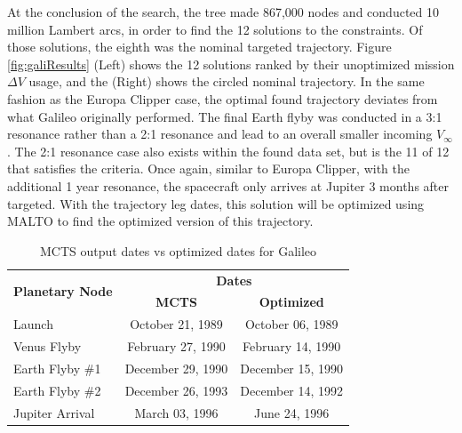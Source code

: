 \documentclass[letterpaper, preprint, paper,11pt]{AAS}	%
\begin{document}
At the conclusion of the search, the tree made 867,000 nodes and conducted 10 million Lambert arcs, in order to find the 12 solutions to the constraints. Of those solutions, the eighth was the nominal targeted trajectory. Figure \ref*{fig:galiResults} (Left) shows the 12 solutions ranked by their unoptimized mission $\Delta V$ usage, and the (Right) shows the circled nominal trajectory. In the same fashion as the Europa Clipper case, the optimal found trajectory deviates from what Galileo originally performed. The final Earth flyby was conducted in a 3:1 resonance rather than a 2:1 resonance and lead to an overall smaller incoming $V_\infty$. The 2:1 resonance case also exists within the found data set, but is the 11 of 12 that satisfies the criteria. Once again, similar to Europa Clipper, with the additional 1 year resonance, the spacecraft only arrives at Jupiter 3 months after targeted. With the trajectory leg dates, this solution will be optimized using MALTO to find the optimized version of this trajectory.
\begin{table}[htb]
    \begin{center}
        \caption{MCTS output dates vs optimized dates for Galileo}
        \label{table:galiMInputs}
        \begin{tabular}{lcc}
            \toprule
            \multirow{2}{*}{\textbf{Planetary Node}} & \multicolumn{2}{c}{\textbf{Dates}}\\
            \cmidrule{2-3}
            {} & \textbf{MCTS} & \textbf{Optimized}\\
            \midrule
            Launch          & October 21, 1989  & October 06, 1989\\
            Venus Flyby     & February 27, 1990 & February 14, 1990 \\
            Earth Flyby \#1 & December 29, 1990 & December 15, 1990 \\
            Earth Flyby \#2 & December 26, 1993 & December 14, 1992 \\
            Jupiter Arrival & March 03, 1996    & June 24, 1996 \\
            \bottomrule
        \end{tabular}
    \end{center}
\end{table}
\end{document}
